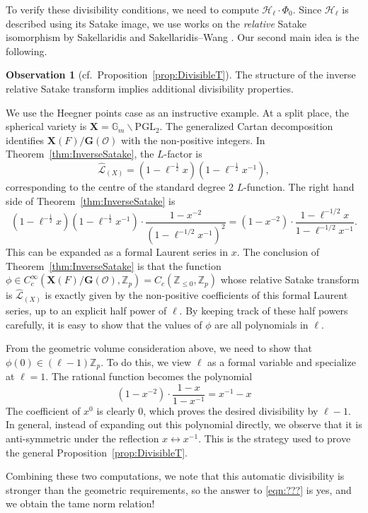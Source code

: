 \documentclass{amsart}
\theoremstyle{definition}
\theoremstyle{remark}
\newcommand{\1}{\mathbf{1}}
\newcommand{\G}{\mathbf{G}}
\newcommand{\mb}[1]{\mathbf{#1}}
\newcommand{\Or}{\mathcal{O}}
\newcommand{\sh}[1]{\mathcal{#1}}
\newcommand{\Z}{\mathbb{Z}}
\theoremstyle{definition}
\newtheorem{observation}[theorem]{Observation}
\renewcommand{\G}{\mathbb{G}}
\begin{document}
To verify these divisibility conditions, we need to compute $\sh{H}_\ell\cdot\Phi_0$. Since $\sh{H}_\ell$ is described using its Satake image, we use works on the \emph{relative} Satake isomorphism by Sakellaridis \cite{SakSpherical} and Sakellaridis--Wang \cite{SakWang}. Our second main idea is the following.
\begin{observation}[cf.~Proposition~\ref{prop:DivisibleT}]
    The structure of the inverse relative Satake transform implies additional divisibility properties.
\end{observation}
\noindent We use the Heegner points case as an instructive example. At a split place, the spherical variety is $\mb{X}=\G_m\backslash\mathrm{PGL}_2$. The generalized Cartan decomposition identifies $\mb{X}(F)/\mb{G}(\Or)$ with the non-positive integers. In Theorem~\ref{thm:InverseSatake}, the $L$-factor is
\[
    \hat{\sh{L}}_{(X)}=(1-\ell^{-\frac{1}{2}}x)(1-\ell^{-\frac{1}{2}}x^{-1}),
\]
corresponding to the centre of the standard degree 2 $L$-function. The right hand side of Theorem~\ref{thm:InverseSatake} is
\[
    (1-\ell^{-\frac{1}{2}}x)(1-\ell^{-\frac{1}{2}}x^{-1})\cdot\frac{1-x^{-2}}{(1-\ell^{-1/2}x^{-1})^2}=(1-x^{-2})\cdot\frac{1-\ell^{-1/2}x}{1-\ell^{-1/2}x^{-1}}.
\]
This can be expanded as a formal Laurent series in $x$. The conclusion of Theorem~\ref{thm:InverseSatake} is that the function $\phi\in C_c^\infty(\mb{X}(F)/\mb{G}(\Or),\Z_p)=C_c(\Z_{\leq 0},\Z_p)$ whose relative Satake transform is $\hat{\sh{L}}_{(X)}$ is exactly given by the non-positive coefficients of this formal Laurent series, up to an explicit half power of $\ell$. By keeping track of these half powers carefully, it is easy to show that the values of $\phi$ are all polynomials in $\ell$.

From the geometric volume consideration above, we need to show that $\phi(0)\in(\ell-1)\Z_p$. To do this, we view $\ell$ as a formal variable and specialize at $\ell=1$. The rational function becomes the polynomial
\[
    (1-x^{-2})\cdot\frac{1-x}{1-x^{-1}}=x^{-1}-x
\]
The coefficient of $x^0$ is clearly 0, which proves the desired divisibility by $\ell-1$. In general, instead of expanding out this polynomial directly, we observe that it is anti-symmetric under the reflection $x\leftrightarrow x^{-1}$. This is the strategy used to prove the general Proposition~\ref{prop:DivisibleT}.

Combining these two computations, we note that this automatic divisibility is stronger than the geometric requirements, so the answer to \eqref{eqn:???} is yes, and we obtain the tame norm relation!
\end{document}
